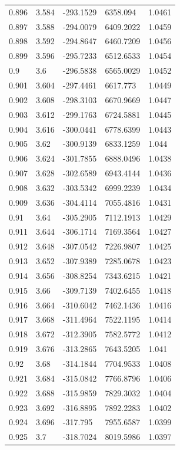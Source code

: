 \begin{tabular}{lllll}
0.896 & 3.584 & -293.1529 & 6358.094 & 1.0461 \\
0.897 & 3.588 & -294.0079 & 6409.2022 & 1.0459 \\
0.898 & 3.592 & -294.8647 & 6460.7209 & 1.0456 \\
0.899 & 3.596 & -295.7233 & 6512.6533 & 1.0454 \\
0.9 & 3.6 & -296.5838 & 6565.0029 & 1.0452 \\
0.901 & 3.604 & -297.4461 & 6617.773 & 1.0449 \\
0.902 & 3.608 & -298.3103 & 6670.9669 & 1.0447 \\
0.903 & 3.612 & -299.1763 & 6724.5881 & 1.0445 \\
0.904 & 3.616 & -300.0441 & 6778.6399 & 1.0443 \\
0.905 & 3.62 & -300.9139 & 6833.1259 & 1.044 \\
0.906 & 3.624 & -301.7855 & 6888.0496 & 1.0438 \\
0.907 & 3.628 & -302.6589 & 6943.4144 & 1.0436 \\
0.908 & 3.632 & -303.5342 & 6999.2239 & 1.0434 \\
0.909 & 3.636 & -304.4114 & 7055.4816 & 1.0431 \\
0.91 & 3.64 & -305.2905 & 7112.1913 & 1.0429 \\
0.911 & 3.644 & -306.1714 & 7169.3564 & 1.0427 \\
0.912 & 3.648 & -307.0542 & 7226.9807 & 1.0425 \\
0.913 & 3.652 & -307.9389 & 7285.0678 & 1.0423 \\
0.914 & 3.656 & -308.8254 & 7343.6215 & 1.0421 \\
0.915 & 3.66 & -309.7139 & 7402.6455 & 1.0418 \\
0.916 & 3.664 & -310.6042 & 7462.1436 & 1.0416 \\
0.917 & 3.668 & -311.4964 & 7522.1195 & 1.0414 \\
0.918 & 3.672 & -312.3905 & 7582.5772 & 1.0412 \\
0.919 & 3.676 & -313.2865 & 7643.5205 & 1.041 \\
0.92 & 3.68 & -314.1844 & 7704.9533 & 1.0408 \\
0.921 & 3.684 & -315.0842 & 7766.8796 & 1.0406 \\
0.922 & 3.688 & -315.9859 & 7829.3032 & 1.0404 \\
0.923 & 3.692 & -316.8895 & 7892.2283 & 1.0402 \\
0.924 & 3.696 & -317.795 & 7955.6587 & 1.0399 \\
0.925 & 3.7 & -318.7024 & 8019.5986 & 1.0397 \\

\end{tabular}
